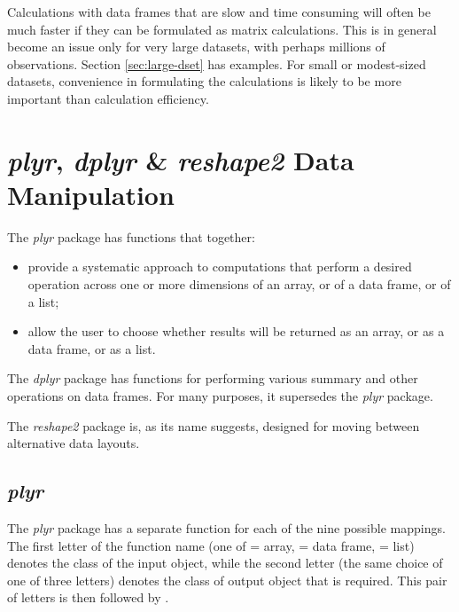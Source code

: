 Calculations with data frames that are slow and time consuming will
often be much faster if they can be formulated as matrix calculations.
This is in general become an issue only for very large datasets,
with perhaps millions of observations. Section \ref{sec:large-dset}
has examples.  For small or modest-sized datasets, convenience in
formulating the calculations is likely to be more important than
calculation efficiency.


\section{{\em plyr},  {\em dplyr} \& {\em reshape2}  Data Manipulation}\label{sec:plyr}

The {\em plyr} package has functions that together:
\begin{itemize}
\item provide a systematic approach to computations that perform a
  desired operation across one or more dimensions of an array, or
  of a data frame, or of a list;
\item allow the user to choose whether results will be returned as an
array, or as a data frame, or as a list.
\end{itemize}

The {\em dplyr} package has functions for performing various summary
and other operations on data frames. For many purposes, it supersedes
the {\em plyr} package.

The {\em reshape2} package is, as its name suggests, designed for
moving between alternative data layouts.

\subsection{{\em plyr} }

The {\em plyr} package has a separate function for each of the nine
possible mappings.  The first letter of the function name (one of
 = array,  = data frame,  = list) denotes the
class of the input object, while the second letter (the same choice of
one of three letters) denotes the class of output object that is
required.  This pair of letters is then followed by .

